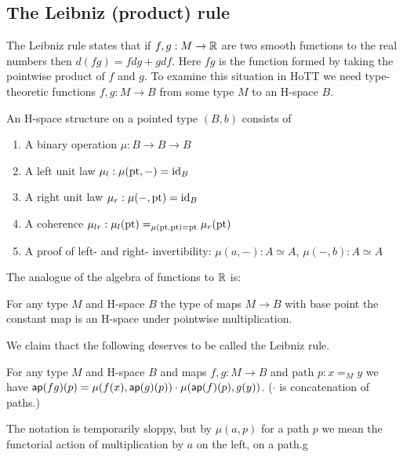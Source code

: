 \documentclass[12pt]{article}
\begin{document}
\subsection{The Leibniz (product) rule}

The Leibniz rule states that if \( f, g:M\to \mathbb{R} \) are two smooth functions to the real numbers then \( d(fg) = fdg + gdf \). Here \( fg \) is the function formed by taking the pointwise product of \( f \) and \( g \). To examine this situation in HoTT we need type-theoretic functions \( f, g:M\to B \) from some type \( M \) to an H-space \( B \).

\begin{mydef}
An H-space structure on a pointed type \( (B,b) \) consists of
\begin{enumerate}
\item A binary operation \( \mu:B\to B\to B \)
\item A left unit law \( \mu_l:\mu(\mathrm{pt},-)=\text{id}_B \)
\item A right unit law \( \mu_r:\mu(-,\mathrm{pt})=\text{id}_B \)
\item A coherence \( \mu_{lr}:\mu_l(\mathrm{pt})=_{\mu(\mathrm{pt},\mathrm{pt})=\mathrm{pt}}\mu_r(\mathrm{pt}) \)
\item A proof of left- and right- invertibility: \( \mu(a,-):A\simeq A \), \( \mu(-, b):A\simeq A \)
\end{enumerate}
\end{mydef}

The analogue of the algebra of functions to \( \mathbb{R} \) is:
\begin{myprop}
For any type \( M \) and H-space \( B \) the type of maps \( M\to B \) with base point the constant map is an H-space under pointwise multiplication.
\end{myprop}

We claim thact the following deserves to be called the Leibniz rule.

\begin{mylemma}
For any type \( M \) and H-space \( B \) and maps \( f,g:M\to B \) and path \( p:x=_M y \) we have \( \mathsf{ap}(fg)(p)=\mu(f(x),\mathsf{ap}(g)(p)) \cdot \mu(\mathsf{ap}(f)(p),g(y)) \). (\( \cdot \) is concatenation of paths.)
\end{mylemma}

The notation is temporarily sloppy, but by \( \mu(a, p) \) for a path \( p \) we mean the functorial action of multiplication by \( a \) on the left, on a path.g
\end{document}
